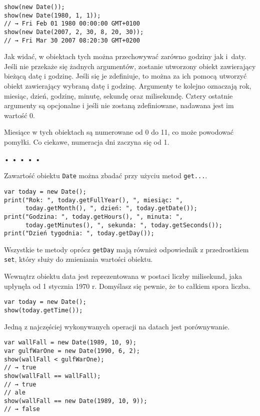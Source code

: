     
\begin{verbatim} 
show(new Date());
show(new Date(1980, 1, 1));
// → Fri Feb 01 1980 00:00:00 GMT+0100
show(new Date(2007, 2, 30, 8, 20, 30));
// → Fri Mar 30 2007 08:20:30 GMT+0200
\end{verbatim}
    
Jak widać, w obiektach tych można przechowywać zarówno godziny jak i~daty. Jeśli nie przekaże się żadnych argumentów, zostanie utworzony obiekt zawierający bieżącą datę i godzinę. Jeśli się je zdefiniuje, to można za ich pomocą utworzyć obiekt zawierający wybraną datę i godzinę. Argumenty te kolejno oznaczają rok, miesiąc, dzień, godzinę, minutę, sekundę oraz milisekundę. Cztery ostatnie argumenty są opcjonalne i jeśli nie zostaną zdefiniowane, nadawana jest im wartość 0.

    
Miesiące w tych obiektach są numerowane od 0 do 11, co może powodować pomyłki. Co ciekawe, numeracja dni zaczyna się od 1.

  
  
\begin{center}
• • • • •
\end{center}
  
    
Zawartość obiektu \texttt{Date} można zbadać przy użyciu metod \texttt{get...}.

    
\begin{verbatim} 
var today = new Date();
print("Rok: ", today.getFullYear(), ", miesiąc: ",
      today.getMonth(), ", dzień: ", today.getDate());
print("Godzina: ", today.getHours(), ", minuta: ",
      today.getMinutes(), ", sekunda: ", today.getSeconds());
print("Dzień tygodnia: ", today.getDay());
 \end{verbatim}
    
Wszystkie te metody oprócz \texttt{getDay} mają również odpowiednik z przedrostkiem \texttt{set}, który służy do zmieniania wartości obiektu.

    
Wewnątrz obiektu data jest reprezentowana w postaci liczby milisekund, jaka upłynęła od 1 stycznia 1970 r. Domyślasz się pewnie, że to całkiem spora liczba.

    
\begin{verbatim} 
var today = new Date();
show(today.getTime());
\end{verbatim}
    
Jedną z najczęściej wykonywanych operacji na datach jest porównywanie.

    
\begin{verbatim} 
var wallFall = new Date(1989, 10, 9);
var gulfWarOne = new Date(1990, 6, 2);
show(wallFall < gulfWarOne);
// → true
show(wallFall == wallFall);
// → true
// ale
show(wallFall == new Date(1989, 10, 9));
// → false
\end{verbatim}
    
